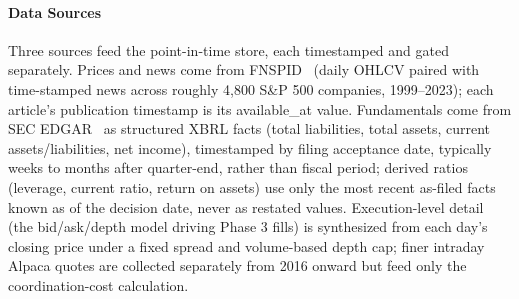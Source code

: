 \documentclass{article}
\begin{document}
\begin{table}[!ht]
  \caption{PIERCEBench summary statistics.}
  \label{tab:benchmark-stats}
  \centering
\end{table}

\paragraph{Data Sources}

Three sources feed the point-in-time store, each timestamped and gated separately. Prices and news come from FNSPID~\cite{dong2024fnspid} (daily OHLCV paired with time-stamped news across roughly 4,800 S\&P 500 companies, 1999--2023); each article's publication timestamp is its available\_at value. Fundamentals come from SEC EDGAR~\cite{secedgar} as structured XBRL facts (total liabilities, total assets, current assets/liabilities, net income), timestamped by filing acceptance date, typically weeks to months after quarter-end, rather than fiscal period; derived ratios (leverage, current ratio, return on assets) use only the most recent as-filed facts known as of the decision date, never as restated values. Execution-level detail (the bid/ask/depth model driving Phase 3 fills) is synthesized from each day's closing price under a fixed spread and volume-based depth cap; finer intraday Alpaca quotes are collected separately from 2016 onward but feed only the coordination-cost calculation.
\end{document}
